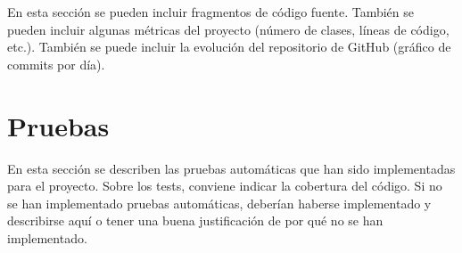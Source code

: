 En esta sección se pueden incluir fragmentos de código fuente. También se pueden incluir algunas métricas del proyecto (número de clases, líneas de código, etc.). También se puede incluir la evolución del repositorio de GitHub (gráfico de commits por día).

\section{Pruebas}
\label{sec:pruebas}

En esta sección se describen las pruebas automáticas que han sido implementadas para el proyecto. Sobre los tests, conviene indicar la cobertura del código. Si no se han implementado pruebas automáticas, deberían haberse implementado y describirse aquí o tener una buena justificación de por qué no se han implementado.
